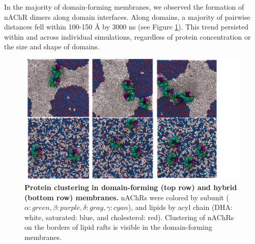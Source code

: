 \documentclass[final,3p,times,twocolumn]{elsarticle}
\begin{document}


In the majority of domain-forming membranes, we observed the formation of nAChR dimers along domain interfaces. Along domains, a majority of pairwise distances  fell within 100-150 {\AA} by 3000 ns (see Figure \ref{fig:Figure4}). This trend persisted within and across individual simulations, regardless of protein concentration or the size and shape of domains.










\begin{figure}[h]
\center
\includegraphics[width=\linewidth,trim={0cm 0cm 0cm 0cm}]{Figure3}
\caption[Protein clustering in domain-forming (top row) and hybrid (bottom row) membranes.]{{\bf Protein clustering in domain-forming (top row) and hybrid (bottom row) membranes.} nAChRs were colored by subunit ($\alpha:green,\beta:purple,\delta:gray,\gamma:cyan$), and lipids by acyl chain (DHA: white, saturated: blue, and cholesterol: red). Clustering of nAChRs on the borders of lipid rafts is visible in the domain-forming membranes.}
\label{fig:Figure4}
\end{figure}
\end{document}
